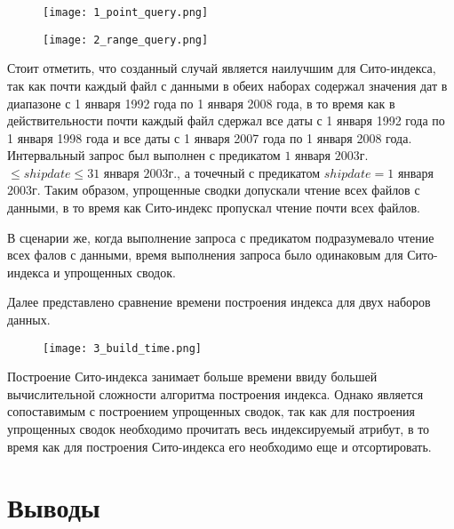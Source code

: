 \begin{figure}[p]
    \centering
    \texttt{[image: 1\_point\_query.png]}
    \caption{}
\end{figure}


\begin{figure}[p]
    \centering
    \texttt{[image: 2\_range\_query.png]}
    \caption{}
\end{figure}

Стоит отметить, что созданный случай является наилучшим для Сито-индекса, так как почти каждый файл с данными в обеих наборах содержал значения дат в диапазоне с 1 января 1992 года по 1 января 2008 года, в то время как в действительности почти каждый файл сдержал все даты с 1 января 1992 года по 1 января 1998 года и все даты с 1 января 2007 года по 1 января 2008 года. Интервальный запрос был выполнен с предикатом $1$ января $2003$г. $\leq shipdate \leq 31$ января $2003$г., а точечный с предикатом $shipdate = 1$ января $2003$г. Таким образом, упрощенные сводки допускали чтение всех файлов с данными, в то время как Сито-индекс пропускал чтение почти всех файлов.

В сценарии же, когда выполнение запроса с предикатом подразумевало чтение всех фалов с данными, время выполнения запроса было одинаковым для Сито-индекса и упрощенных сводок.

Далее представлено сравнение времени построения индекса для двух наборов данных.

\begin{figure}[h]
    \centering
    \texttt{[image: 3\_build\_time.png]}
    \caption{}
\end{figure}

Построение Сито-индекса занимает больше времени ввиду большей вычислительной сложности алгоритма построения индекса. Однако является сопоставимым с построением упрощенных сводок, так как для построения упрощенных сводок необходимо прочитать весь индексируемый атрибут, в то время как для построения Сито-индекса его необходимо еще и отсортировать.


\newpage
\section*{Выводы}

